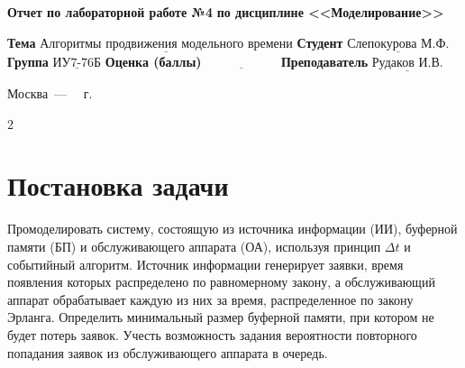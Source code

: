 \documentclass[12pt]{report}
\begin{document}
\begin{titlepage}
		\begin{center}
			\noindent\begin{minipage}{1.1\textwidth}\centering
				\Large\textbf{Отчет по лабораторной работе №4}\newline
				\textbf{по дисциплине <<Моделирование>>}\newline\newline
			\end{minipage}
		\end{center}
		
		\noindent\textbf{Тема} $\underline{\text{Алгоритмы продвижения модельного времени}}$\newline\newline
		\noindent\textbf{Студент} $\underline{\text{Слепокурова М.Ф.}}$\newline\newline
		\noindent\textbf{Группа} $\underline{\text{ИУ7-76Б}}$\newline\newline
		\noindent\textbf{Оценка (баллы)} $\underline{\text{~~~~~~~~~~~~~~~~~}}$\newline\newline
		\noindent\textbf{Преподаватель} $\underline{\text{Рудаков И.В.}}$\newline\newline\newline
		
		\begin{center}
			\vfill
			Москва~---~\the\year
			~г.
		\end{center}
	\end{titlepage}

\setcounter{page} {2}





\section*{Постановка задачи}
Промоделировать систему, состоящую из источника информации (ИИ), буферной памяти (БП) и обслуживающего аппарата (ОА), используя принцип $\Delta t$ и событийный алгоритм. Источник информации генерирует заявки, время появления которых распределено по равномерному закону, а обслуживающий аппарат обрабатывает каждую из них за время, распределенное по закону Эрланга.
Определить минимальный размер буферной памяти, при котором не будет потерь заявок. Учесть возможность задания вероятности повторного попадания заявок из обслуживающего аппарата в очередь.
\end{document}
